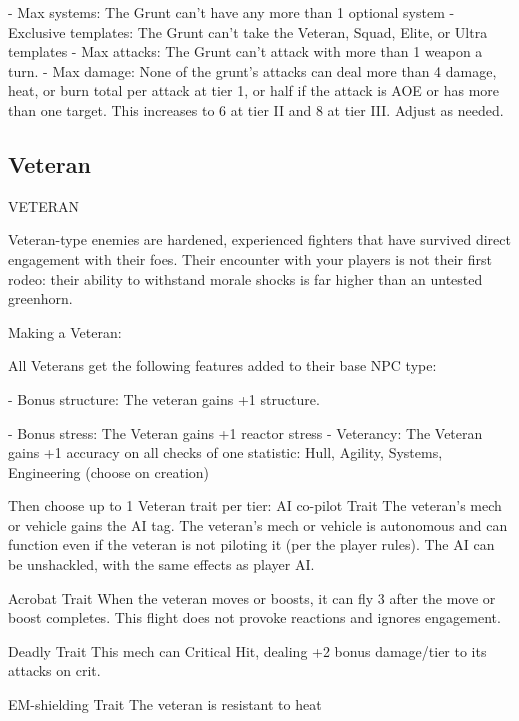     -    Max systems: The Grunt can’t have any more than 1 optional system  
    -    Exclusive templates: The Grunt can’t take the Veteran, Squad, Elite, or Ultra templates  
    -    Max attacks: The Grunt can’t attack with more than 1 weapon a turn.  
    -    Max damage: None of the grunt’s attacks can deal more than 4 damage, heat, or burn  
        total per attack at tier 1, or half if the attack is AOE or has more than one target. This  
         increases to 6 at tier II and 8 at tier III. Adjust as needed.  

                                                                                                           

\subsection{Veteran}
                                                   VETERAN  

Veteran-type enemies are hardened, experienced fighters that have survived direct engagement  
with their foes. Their encounter with your players is not their first rodeo: their ability to withstand  
morale shocks is far higher than an untested greenhorn.
 

Making a Veteran:
 
All Veterans get the following features added to their base NPC type:
 
     -   Bonus structure: The veteran gains +1 structure.
 
     -   Bonus stress: The Veteran gains +1 reactor stress  
     -   Veterancy: The Veteran gains +1 accuracy on all checks of one statistic: Hull, Agility,  
         Systems, Engineering (choose on creation)  

Then choose up to 1 Veteran trait per tier:  
AI co-pilot  
Trait  
The veteran’s mech or vehicle gains the AI tag. The veteran’s mech or vehicle is autonomous and  
can function even if the veteran is not piloting it (per the player rules). The AI can be unshackled,  
with the same effects as player AI.
 

Acrobat  
Trait  
When the veteran moves or boosts, it can fly 3 after the move or boost completes. This flight  
does not provoke reactions and ignores engagement.
 

Deadly  
Trait  
This mech can Critical Hit, dealing +2 bonus damage/tier to its attacks on crit.
 

EM-shielding  
Trait  
The veteran is resistant to heat
 

